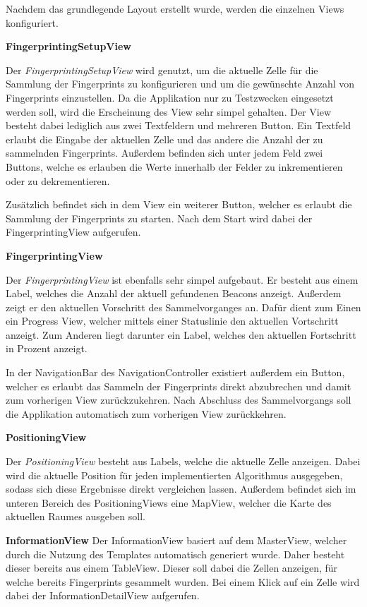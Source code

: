 Nachdem das grundlegende Layout erstellt wurde, werden die einzelnen Views konfiguriert.

\textbf{FingerprintingSetupView}


Der \emph{FingerprintingSetupView} wird genutzt, um die aktuelle Zelle für die Sammlung der Fingerprints zu konfigurieren und um die gewünschte Anzahl von Fingerprints einzustellen. Da die Applikation nur zu Testzwecken eingesetzt werden soll, wird die Erscheinung des View sehr simpel gehalten. 
Der View besteht dabei lediglich aus zwei Textfeldern und mehreren Button. 
Ein Textfeld erlaubt die Eingabe der aktuellen Zelle und das andere die Anzahl der zu sammelnden Fingerprints.
Außerdem befinden sich unter jedem Feld zwei Buttons, welche es erlauben die Werte innerhalb der Felder zu inkrementieren oder zu dekrementieren.

Zusätzlich befindet sich in dem View ein weiterer Button, welcher es erlaubt die Sammlung der Fingerprints zu starten. 
Nach dem Start wird dabei der FingerprintingView aufgerufen.


\textbf{FingerprintingView}

Der \emph{FingerprintingView} ist ebenfalls sehr simpel aufgebaut.
Er besteht aus einem Label, welches die Anzahl der aktuell gefundenen Beacons anzeigt.
Außerdem zeigt er den aktuellen Vorschritt des Sammelvorganges an. Dafür dient zum Einen ein Progress View, welcher mittels einer Statuslinie den aktuellen Vortschritt anzeigt. Zum Anderen liegt darunter ein Label, welches den aktuellen Fortschritt in Prozent anzeigt.

In der NavigationBar des NavigationController existiert außerdem ein Button, welcher es erlaubt das Sammeln der Fingerprints direkt abzubrechen und damit zum vorherigen View zurückzukehren. Nach Abschluss des Sammelvorgangs soll die Applikation automatisch zum vorherigen View zurückkehren.


\textbf{PositioningView}

Der \emph{PositioningView} besteht aus Labels, welche die aktuelle Zelle anzeigen. Dabei wird die aktuelle Position für jeden implementierten Algorithmus ausgegeben, sodass sich diese Ergebnisse direkt vergleichen lassen. Außerdem befindet sich im unteren Bereich des PositioningViews eine MapView, welcher die Karte des aktuellen Raumes ausgeben soll.


\textbf{InformationView} 
Der InformationView basiert auf dem MasterView, welcher durch die Nutzung des Templates automatisch generiert wurde. Daher besteht dieser bereits aus einem TableView.
Dieser soll dabei die Zellen anzeigen, für welche bereits Fingerprints gesammelt wurden. Bei einem Klick auf ein Zelle wird dabei der InformationDetailView aufgerufen.

